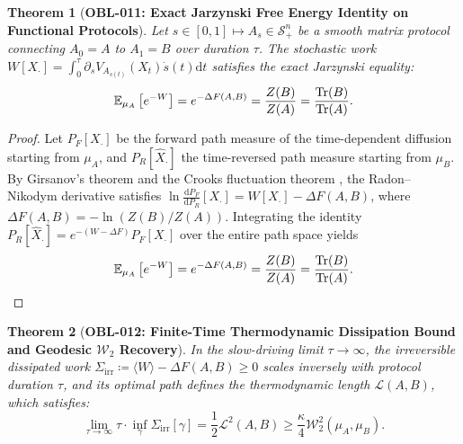 \documentclass[11pt,a4paper,reqno]{amsart}
\newtheorem{theorem}{Theorem}[section]
\theoremstyle{definition}
\theoremstyle{remark}
\numberwithin{equation}{section}
\newcommand{\dif}{\mathrm{d}}
\begin{document}
\begin{theorem}[\textbf{OBL-011: Exact Jarzynski Free Energy Identity on Functional Protocols}]
\label{thm:jarzynski_identity}
Let $s \in [0, 1] \mapsto A_s \in \mathcal{S}_+^n$ be a smooth matrix protocol connecting $A_0 = A$ to $A_1 = B$ over duration $\tau$. The stochastic work $W[X_\cdot] = \int_0^\tau \partial_s V_{A_{s(t)}}(X_t) \dot{s}(t) \dif t$ satisfies the exact Jarzynski equality:
\begin{equation}
\mathbb{E}_{\mu_A} \left[ e^{-W} \right] = e^{-\Delta F(A, B)} = \frac{Z(B)}{Z(A)} = \frac{\Tr(B)}{\Tr(A)}.
\end{equation}
\end{theorem}

\begin{proof}
Let $P_F[X_\cdot]$ be the forward path measure of the time-dependent diffusion starting from $\mu_A$, and $P_R[\hat{X}_\cdot]$ the time-reversed path measure starting from $\mu_B$. By Girsanov's theorem and the Crooks fluctuation theorem \cite{Jarzynski1997}, the Radon--Nikodym derivative satisfies $\ln \frac{\dif P_F}{\dif P_R}[X_\cdot] = W[X_\cdot] - \Delta F(A, B)$, where $\Delta F(A, B) = -\ln(Z(B)/Z(A))$. Integrating the identity $P_R[\hat{X}_\cdot] = e^{-(W - \Delta F)} P_F[X_\cdot]$ over the entire path space yields
\begin{equation}
\mathbb{E}_{\mu_A} \left[ e^{-W} \right] = e^{-\Delta F(A, B)} = \frac{Z(B)}{Z(A)} = \frac{\Tr(B)}{\Tr(A)}.
\end{equation}
\end{proof}

\begin{theorem}[\textbf{OBL-012: Finite-Time Thermodynamic Dissipation Bound and Geodesic $\mathcal{W}_2$ Recovery}]
\label{thm:thermo_length_w2}
In the slow-driving limit $\tau \to \infty$, the irreversible dissipated work $\Sigma_{\mathrm{irr}} \coloneqq \langle W \rangle - \Delta F(A, B) \ge 0$ scales inversely with protocol duration $\tau$, and its optimal path defines the thermodynamic length $\mathcal{L}(A, B)$, which satisfies:
\begin{equation}
\lim_{\tau \to \infty} \tau \cdot \inf_\gamma \Sigma_{\mathrm{irr}}[\gamma] = \frac{1}{2} \mathcal{L}^2(A, B) \ge \frac{\kappa}{4} \mathcal{W}_2^2(\mu_A, \mu_B).
\end{equation}
\end{theorem}
\end{document}
